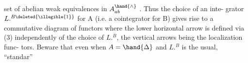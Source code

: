 set of abelian weak equivalences in $A^{\hand{\wedge}}_{ab}$ .   Thus the choice of an inte-%
grator  $L.^{B\deleted{\illegible{1}}}$  for A (i.e. a cointegrator for B) gives rise to a commutative
diagram of functors
where the  lower horizontal arrow is defined via (3) \hand{(}independently
of the choice of $L.^{B}$\hand{)},  the vertical arrows being the localization func-%
tors.   Beware that even when  $A=\hand{\Delta}$  and $L.^{B}$  is the usual, ``standar''

